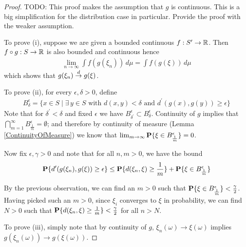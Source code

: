 \begin{proof}

TODO: This proof makes the assumption that $g$ is continuous.  This is
a big simplification for the distribution case in particular.  Provide
the proof with the weaker assumption.

To prove (i), suppose we are given a bounded continuous $f : S^\prime
\to \mathbb{R}$.  Then $f \circ g : S \to \mathbb{R}$ is also bounded and
continuous hence
\begin{align*}
\lim_{n \to \infty} \int f(g(\xi_n)) \, d\mu = \int f(g(\xi)) \, d\mu
\end{align*}
which shows that $g(\xi_n) \overset{d}\to g(\xi)$.

To prove (ii), for every $\epsilon, \delta > 0$, define 
\begin{align*}
B^\epsilon_\delta = \{ x \in S \mid \exists \, y \in S \text{ with }
d(x,y) < \delta \text{ and } d^\prime(g(x), g(y)) \geq \epsilon\}
\end{align*}
Note that for $\delta^\prime < \delta$ and fixed $\epsilon$ we have
$B^\epsilon_{\delta^\prime} \subset B^\epsilon_{\delta}$.  Continuity
of $g$ implies that $\bigcap_{m=1}^\infty
  B^\epsilon_{\frac{1}{m}} = \emptyset$; and therefore by continuity of
  measure (Lemma
\ref{ContinuityOfMeasure}) we know that $\lim_{m \to \infty} \textbf{P}\{\xi \in B^\epsilon_{\frac{1}{m}}\} = 0$.

Now fix $\epsilon,\gamma >0$ and note that for all $n,m > 0$, we have
the bound
\begin{align*}
\textbf{P}\{d^\prime(g(\xi_n),
  g(\xi)) \geq \epsilon\} \leq \textbf{P}\{d(\xi_n, \xi) \geq
  \frac{1}{m}\} + \textbf{P}\{\xi \in B^\epsilon_{\frac{1}{m}}\}
\end{align*}

By the previous observation, we can find an $m>0$ such that
$\textbf{P}\{\xi \in B^\epsilon_{\frac{1}{m}}\} < \frac{\gamma}{2}$.
Having picked such an $m>0$, since $\xi_i$ converges to $\xi$ in
probability, we can find $N >0$ such that $\textbf{P}\{d(\xi_n, \xi) \geq
  \frac{1}{m}\} < \frac{\gamma}{2}$ for all $n > N$.

To prove (iii), simply note that by continuity of $g$, $\xi_n(\omega)
\to \xi(\omega)$ implies $g(\xi_n(\omega)) \to g(\xi(\omega))$.
\end{proof}

